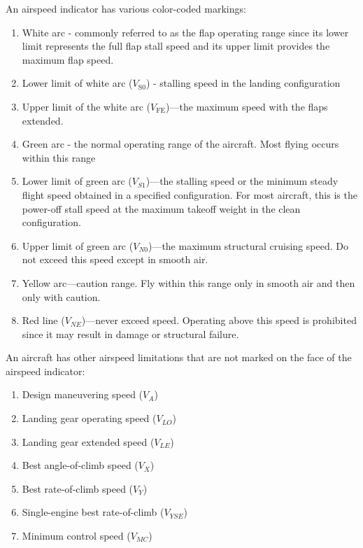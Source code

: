 \documentclass[12pt]{article}
\begin{document}
				An airspeed indicator has various color-coded markings:
					\begin{enumerate}
						\item White arc - commonly referred to as the flap operating range since its lower limit represents the full flap stall speed and its upper limit provides the maximum flap speed.
						\item Lower limit of white arc ($V_\text{S0}$) - stalling speed in the landing configuration
						\item Upper limit of the white arc ($V_\text{FE}$)—the maximum speed with the flaps extended.
						\item Green arc - the normal operating range of the aircraft. Most flying occurs within this range
						\item Lower limit of green arc ($V_{S1}$)—the stalling speed or the minimum steady flight speed obtained in a specified configuration. For most aircraft, this is the power-off stall speed at the maximum takeoff weight in the clean configuration.
						\item Upper limit of green arc ($V_{N0}$)—the maximum structural cruising speed. Do not exceed this speed except in smooth air.
						\item Yellow arc—caution range. Fly within this range only in smooth air and then only with caution.
						\item Red line ($V_{NE}$)—never exceed speed. Operating above this speed is prohibited since it may result in damage or structural failure.
					\end{enumerate}
				An aircraft has other airspeed limitations that are not marked on the face of the airspeed indicator:
					\begin{multicols}{2}
					\begin{enumerate}
						\item Design maneuvering speed ($V_A$)
						\item Landing gear operating speed ($V_{LO}$)
						\item Landing gear extended speed ($V_{LE}$)
						\item Best angle-of-climb speed ($V_X$)
						\item Best rate-of-climb speed ($V_Y$)
						\item Single-engine best rate-of-climb ($V_{YSE}$)
						\item Minimum control speed ($V_{MC}$)
					\end{enumerate}
					\end{multicols}
\end{document}
